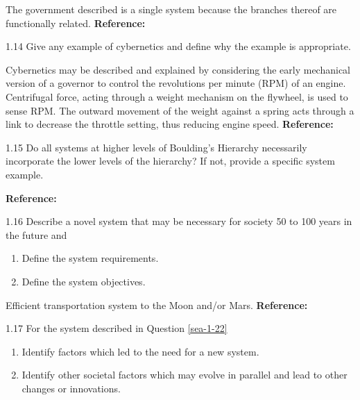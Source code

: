 \begin{exsol@solution}{}
        The government described is a single system because the branches thereof are functionally related. \textbf{Reference:}
\end{exsol@solution}
\begin{exsol@exercise}{1.14}
    \label{sea-1-19}
        Give any example of cybernetics and define why the example is appropriate.
\end{exsol@exercise}
\begin{exsol@solution}{}
        Cybernetics may be described and explained by considering the early mechanical version of a governor to control the revolutions per minute (RPM) of an engine. Centrifugal force, acting through a weight mechanism on the flywheel, is used to sense RPM. The outward movement of the weight against a spring acts through a link to decrease the throttle setting, thus reducing engine speed. \textbf{Reference:}
\end{exsol@solution}
\begin{exsol@exercise}{1.15}
    \label{sea-1-21}
        Do all systems at higher levels of Boulding's Hierarchy necessarily incorporate the lower levels of the hierarchy? If not, provide a specific system example.
\end{exsol@exercise}
\begin{exsol@solution}{}
        \textbf{Reference:}
\end{exsol@solution}
\begin{exsol@exercise}{1.16}
    \label{sea-1-22}
        Describe a novel system that may be necessary for society 50 to 100 years in the future and
        \begin{enumerate}[label=\alph*)]
            \item Define the system requirements.
            \item Define the system objectives.
        \end{enumerate}
\end{exsol@exercise}
\begin{exsol@solution}{}
        Efficient transportation system to the Moon and/or Mars. \textbf{Reference:}
\end{exsol@solution}
\begin{exsol@exercise}{1.17}
    \label{sea-1-25}
        For the system described in Question \ref{sea-1-22}
        \begin{enumerate}[label=\alph*)]
            \item Identify factors which led to the need for a new system.
            \item Identify other societal factors which may evolve in parallel and lead to other changes or innovations.
        \end{enumerate}
\end{exsol@exercise}

